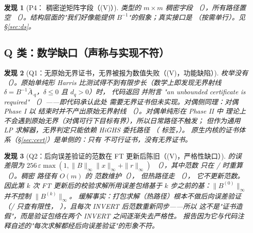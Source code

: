 \documentclass[11pt]{ctexart}
\newtheorem{finding}{发现}
\begin{document}
\begin{finding}[P4： 稠密逆矩阵字段（(V)）]
 类型的 $m\times m$ 稠密字段
（），所有路径置空
（）。结构层面的"我们好像能提供
$B^{-1}$"的假象；真实接口是 
（按需单行）。见 \S\ref{sec:ds}。
\end{finding}

\subsection{Q 类：数学缺口（声称与实现不符）}

\begin{finding}[Q1：无原始无界证书，无界被报为数值失败（(V)，功能缺陷）]
 枚举没有 
（）。原始单纯形
Harris 比测试得不到有限步长（数学上即发现无界射线
$\delta = B^{-1}\bar A_{\cdot q}$，$\delta \le 0$ 且 $d_q > 0$）时，
代码返回  并附言
"an unbounded certificate is required"
（）——即代码\emph{承认}此处
需要无界证书但未实现。对偶侧同理：对偶 Phase I 以
 结束时并不产出原始无界射线
（）。对偶单纯形在 Phase II 中
理论上不会遇到原始无界（对偶可行下目标有界），所以日常路径不触发；
但作为通用 LP 求解器，无界判定只能依赖 HiGHS 委托路径
（ 标签，）。
原生内核的证书体系（\S\ref{sec:cert}）是\emph{单侧}的：只有
不可行证书，没有无界证书。
\end{finding}

\begin{finding}[Q2：后向误差验证的范数在 FT 更新后陈旧（(V)，严格性缺口）]
 的误差限为
$256\,\varepsilon\max(1,\|B\|_\infty\|x\|_\infty + \|r\|_\infty)$
（），其中范数
 只在 / 时重算
（）。稠密  路径有
$O(m)$ 的  范数维护（），
但热路径走 （），
它不更新范数。因此第 $k$ 次 FT 更新后的校验求解所用误差包络基于
$k$ 步之前的基：$\|B^{(0)}\|_\infty$ 并不控制 $\|B^{(k)}\|_\infty$。
缓解事实：打包求解（热路径）根本不做后向误差验证
（/ 只查有限性，
），且每次 INVERT 后范数重新同步——所以
这不是"证书造假"，而是验证包络在两个 INVERT 之间逐渐失去严格性。
报告因为它与代码注释自述的"每次求解都经后向误差验证"的形象不符。
\end{finding}
\end{document}
